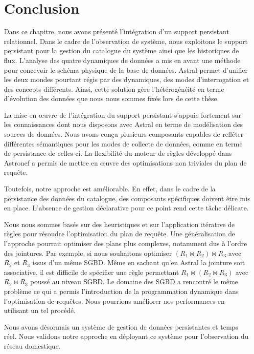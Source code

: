 \section{Conclusion}\label{sec:contrib:asteroid:conclusion}
Dans ce chapitre, nous avons présenté l'intégration d'un support persistant relationnel. Dans le cadre de l'observation de système, nous exploitons le support persistant pour la gestion du catalogue du système ainsi que les historiques de flux. L'analyse des quatre dynamiques de données a mis en avant une méthode pour concevoir le schéma physique de la base de données. Astral permet d'unifier les deux mondes pourtant régis par des dynamiques, des modes d'interrogation et des concepts différents. Ainsi, cette solution gère l'hétérogénéité en terme d'évolution des données que nous nous sommes fixés lors de cette thèse.

La mise en œuvre de l'intégration du support persistant s'appuie fortement sur les connaissances dont nous disposons avec Astral en terme de modélisation des sources de données. Nous avons conçu plusieurs composants capables de refléter différentes sémantiques pour les modes de collecte de données, comme en terme de persistance de celles-ci. La flexibilité du moteur de règles développé dans Astronef a permis de mettre en œuvre des optimisations non triviales du plan de requête.

Toutefois, notre approche est améliorable. En effet, dans le cadre de la persistance des données du catalogue, des composants spécifiques doivent être mis en place. L'absence de gestion déclarative pour ce point rend cette tâche délicate. 

Nous nous sommes basés sur des heuristiques et sur l'application itérative de règles pour résoudre l'optimisation du plan de requête. Une généralisation de l'approche pourrait optimiser des plans plus complexes, notamment dus à l'ordre des jointures. Par exemple, si nous souhaitons optimiser $(R_1 \Join R_2) \Join R_3$ avec $R_2$ et $R_3$ issus d'un même SGBD. Même en sachant qu'en Astral la jointure soit associative, il est difficile de spécifier une règle permettant $R_1 \Join (R_2 \Join R_3)$ avec $R_2\Join R_3$ poussé au niveau SGBD. Le domaine des SGBD a rencontré le même problème ce qui a permis l'introduction de la programmation dynamique dans l'optimisation de requêtes. Nous pourrions améliorer nos performances en utilisant un tel procédé.

Nous avons désormais un système de gestion de données persistantes et temps réel. Nous validons notre approche en déployant ce système pour l'observation du réseau domestique.